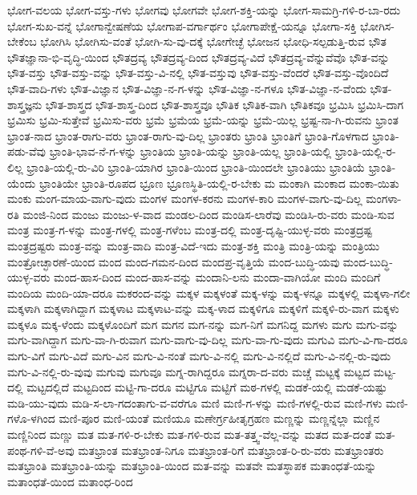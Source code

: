 {ಭೋಗ-ವಲಯ
ಭೋಗ-ವಸ್ತು-ಗಳು
ಭೋಗವು
ಭೋಗವೇ
ಭೋಗ-ಶಕ್ತಿ-ಯನ್ನು
ಭೋಗ-ಸಾಮಗ್ರಿ-ಗಳಿ-ರ-ಬಾ-ರದು
ಭೋಗ-ಸುಖ-ವನ್ನೆ
ಭೋಗಾನ್ವೇಷಣೆಯ
ಭೋಗಾಪ-ವರ್ಗಾರ್ಥಂ
ಭೋಗಾಪೇಕ್ಷೆ-ಯನ್ನೂ
ಭೋಗಾ-ಸಕ್ತಿ
ಭೋಗಿಸ-ಬೇಕೆಂಬ
ಭೋಗಿಸಿ
ಭೋಗಿಸು-ವಂತೆ
ಭೋಗಿ-ಸು-ವು-ದಕ್ಕೆ
ಭೋಗೇಚ್ಛೆ
ಭೋಜನ
ಭೋಧಿ-ಸಲ್ಪಡುತ್ತಿ-ರುವ
ಭೌತ
ಭೌತಜ್ಞಾನಾ-ಭಿ-ವೃದ್ಧಿ-ಯಿಂದ
ಭೌತದ್ರವ್ಯ
ಭೌತದ್ರವ್ಯ-ದಿಂದ
ಭೌತದ್ರವ್ಯ-ವಿದೆ
ಭೌತದ್ರವ್ಯ-ವೆನ್ನುವೆವೊ
ಭೌತ-ವನ್ನು
ಭೌತ-ವಸ್ತು
ಭೌತ-ವಸ್ತು-ವನ್ನು
ಭೌತ-ವಸ್ತು-ವಿ-ನಲ್ಲಿ
ಭೌತ-ವಸ್ತುವು
ಭೌತ-ವಸ್ತು-ವೆಂದರೆ
ಭೌತ-ವಸ್ತು-ವೊಂದಿದೆ
ಭೌತ-ವಾದಿ-ಗಳು
ಭೌತ-ವಿಜ್ಞಾನ
ಭೌತ-ವಿಜ್ಞಾ-ನ-ಗ-ಳನ್ನು
ಭೌತ-ವಿಜ್ಞಾ-ನ-ಗಳೂ
ಭೌತ-ವಿಜ್ಞಾ-ನ-ವೆಂದು
ಭೌತ-ಶಾಸ್ತ್ರಜ್ಞನು
ಭೌತ-ಶಾಸ್ತ್ರದ
ಭೌತ-ಶಾಸ್ತ್ರ-ದಿಂದ
ಭೌತ-ಶಾಸ್ತ್ರವೂ
ಭೌತಿಕ
ಭೌತಿಕ-ವಾಗಿ
ಭೌತಿಕವೂ
ಭ್ರಮಿಸಿ
ಭ್ರಮಿಸಿ-ದಾಗ
ಭ್ರಮಿಸು
ಭ್ರಮಿ-ಸುತ್ತೇವೆ
ಭ್ರಮಿಸು-ವರು
ಭ್ರಮೆ
ಭ್ರಮೆಯ
ಭ್ರಮೆ-ಯನ್ನು
ಭ್ರಮೆ-ಯಿಲ್ಲ
ಭ್ರಷ್ಟ-ನಾ-ಗಿ-ರುವನು
ಭ್ರಾಂತ
ಭ್ರಾಂತ-ನಾದ
ಭ್ರಾಂತ-ರಾಗು-ವರು
ಭ್ರಾಂತ-ರಾಗು-ವು-ದಿಲ್ಲ
ಭ್ರಾಂತರು
ಭ್ರಾಂತಿ
ಭ್ರಾಂತಿಗೆ
ಭ್ರಾಂತಿ-ಗೊಳಗಾದ
ಭ್ರಾಂತಿ-ಪಡು-ವೆವು
ಭ್ರಾಂತಿ-ಭಾವ-ನೆ-ಗ-ಳನ್ನು
ಭ್ರಾಂತಿಯ
ಭ್ರಾಂತಿ-ಯನ್ನು
ಭ್ರಾಂತಿ-ಯಲ್ಲ
ಭ್ರಾಂತಿ-ಯಲ್ಲಿ
ಭ್ರಾಂತಿ-ಯಲ್ಲಿ-ರ-ಲಿಲ್ಲ
ಭ್ರಾಂತಿ-ಯಲ್ಲಿ-ರು-ವಿರಿ
ಭ್ರಾಂತಿ-ಯಾಗಿರ
ಭ್ರಾಂತಿ-ಯಿಂದ
ಭ್ರಾಂತಿ-ಯಿಂದಲೇ
ಭ್ರಾಂತಿಯು
ಭ್ರಾಂತಿಯೆ
ಭ್ರಾಂತಿ-ಯೆಂದು
ಭ್ರಾಂತಿಯೇ
ಭ್ರಾಂತಿ-ರೂಪದ
ಭ್ರೂಣ
ಭ್ರೂಣಸ್ಥಿತಿ-ಯಲ್ಲಿ-ರ-ಬೇಕು
ಮ
ಮಂಕಾಗಿ
ಮಂಕಾದ
ಮಂಕಾ-ಯಿತು
ಮಂಕು
ಮಂಗ-ಮಾಯ-ವಾಗು-ವುದು
ಮಂಗಳ
ಮಂಗಳ-ಕರನು
ಮಂಗಳ-ಕಾರಿ
ಮಂಗಳ-ವಾಗು-ವು-ದಿಲ್ಲ
ಮಂಗಳಾ-ರತಿ
ಮಂಜಿ-ನಿಂದ
ಮಂಜು
ಮಂಜು-ಳ-ವಾದ
ಮಂಡಲ-ದಿಂದ
ಮಂಡಿಸ-ಲಾರೆವು
ಮಂಡಿಸಿ-ರು-ವರು
ಮಂಡಿ-ಸುವ
ಮಂತ್ರ
ಮಂತ್ರ-ಗ-ಳನ್ನು
ಮಂತ್ರ-ಗಳಲ್ಲಿ
ಮಂತ್ರ-ಗಳೆಂಬ
ಮಂತ್ರ-ದಲ್ಲಿ
ಮಂತ್ರ-ದೃಷ್ಟಿ-ಯುಳ್ಳ-ವರು
ಮಂತ್ರದ್ರಷ್ಟ
ಮಂತ್ರದ್ರಷ್ಟರು
ಮಂತ್ರ-ವನ್ನು
ಮಂತ್ರ-ವಾದಿ
ಮಂತ್ರ-ವಿದೆ-ಇದು
ಮಂತ್ರ-ಶಕ್ತಿ
ಮಂತ್ರಿ
ಮಂತ್ರಿ-ಯನ್ನು
ಮಂತ್ರಿಯು
ಮಂತ್ರೋಚ್ಛಾರಣೆ-ಯಿಂದ
ಮಂದ
ಮಂದ-ಗಮನ-ದಿಂದ
ಮಂದಪ್ರ-ವೃತ್ತಿಯೆ
ಮಂದ-ಬುದ್ಧಿ-ಯವು
ಮಂದ-ಬುದ್ಧಿ-ಯುಳ್ಳ-ವರು
ಮಂದ-ಹಾಸ-ದಿಂದ
ಮಂದ-ಹಾಸ-ವನ್ನು
ಮಂದಾನಿ-ಲನು
ಮಂದಾ-ವಾಗಿಯೋ
ಮಂದಿ
ಮಂದಿಗೆ
ಮಂದಿಯ
ಮಂದಿ-ಯಾ-ದರೂ
ಮಕರಂದ-ವನ್ನು
ಮಕ್ಕಳ
ಮಕ್ಕಳಂತೆ
ಮಕ್ಕ-ಳನ್ನು
ಮಕ್ಕ-ಳನ್ನೂ
ಮಕ್ಕಳಲ್ಲಿ
ಮಕ್ಕಳಾ-ಗಲೀ
ಮಕ್ಕಳಾಗಿ
ಮಕ್ಕಳಾಗಿದ್ದಾಗ
ಮಕ್ಕಳಾಟ
ಮಕ್ಕಳಾಟ-ವನ್ನು
ಮಕ್ಕ-ಳಾದ
ಮಕ್ಕಳಿಗೂ
ಮಕ್ಕಳಿಗೆ
ಮಕ್ಕಳಿ-ರು-ವಾಗ
ಮಕ್ಕಳು
ಮಕ್ಕಳೂ
ಮಕ್ಕ-ಳೆಂದು
ಮಕ್ಕಳೊಂದಿಗೆ
ಮಗ
ಮಗನ
ಮಗ-ನನ್ನು
ಮಗ-ನಿಗೆ
ಮಗನಿದ್ದ
ಮಗಳು
ಮಗು
ಮಗು-ವನ್ನು
ಮಗು-ವಾಗಿದ್ದಾಗ
ಮಗು-ವಾ-ಗಿ-ರುವಾಗ
ಮಗು-ವಾಗು-ವು-ದಿಲ್ಲ
ಮಗು-ವಾ-ಗು-ವುದು
ಮಗುವಿ
ಮಗು-ವಿ-ಗಾ-ದರೂ
ಮಗು-ವಿಗೆ
ಮಗು-ವಿದೆ
ಮಗು-ವಿನ
ಮಗು-ವಿ-ನಂತೆ
ಮಗು-ವಿ-ನಲ್ಲಿ
ಮಗು-ವಿ-ನಲ್ಲಿದೆ
ಮಗು-ವಿ-ನಲ್ಲಿ-ರು-ವುದು
ಮಗು-ವಿ-ನಲ್ಲಿ-ರು-ವುವು
ಮಗುವು
ಮಗುವೂ
ಮಗ್ನ-ರಾಗಿದ್ದರೂ
ಮಗ್ನರಾ-ದ-ವರು
ಮಚ್ಚೆ
ಮಟ್ಟಕ್ಕೆ
ಮಟ್ಟದ
ಮಟ್ಟ-ದಲ್ಲಿ
ಮಟ್ಟದಲ್ಲಿದೆ
ಮಟ್ಟದಿಂದ
ಮಟ್ಟಿ-ಗಾ-ದರೂ
ಮಟ್ಟಿಗೂ
ಮಟ್ಟಿಗೆ
ಮಠ-ಗಳಲ್ಲಿ
ಮಡಕೆ-ಯಲ್ಲಿ
ಮಡಕೆ-ಯಷ್ಟು
ಮಡಿ-ಯು-ವುದು
ಮಡಿ-ಸ-ಲಾ-ಗದಂತಾಗು-ವ-ವರೆಗೂ
ಮಣಿ
ಮಣಿ-ಗ-ಳನ್ನು
ಮಣಿ-ಗಳಲ್ಲಿ-ರುವ
ಮಣಿ-ಗಳು
ಮಣಿ-ಗಳೊ-ಳಗಿಂದ
ಮಣಿ-ಪೂರ
ಮಣಿ-ಯಂತೆ
ಮಣಿಯೂ
ಮಣೇರ್ಗ್ರಹೀತೃಗ್ರಹಣ
ಮಣ್ಣನ್ನು
ಮಣ್ಣನ್ನೆಲ್ಲಾ
ಮಣ್ಣಿನ
ಮಣ್ಣಿನಿಂದ
ಮಣ್ಣು
ಮತ
ಮತ-ಗಳಿ-ರ-ಬೇಕು
ಮತ-ಗಳಿ-ರುವ
ಮತ-ತತ್ತ್ವ-ವೆಲ್ಲ-ವನ್ನು
ಮತದ
ಮತ-ದಂತೆ
ಮತ-ಪಂಥ-ಗಳಿ-ವೆ-ಅವು
ಮತಭ್ರಾಂತ
ಮತಭ್ರಾಂತ-ನಿಗೂ
ಮತಭ್ರಾಂತ-ರಿಗೆ
ಮತಭ್ರಾಂತ-ರಿ-ರು-ವರು
ಮತಭ್ರಾಂತರು
ಮತಭ್ರಾಂತಿ
ಮತಭ್ರಾಂತಿ-ಯನ್ನು
ಮತಭ್ರಾಂತಿ-ಯಿಂದ
ಮತ-ವನ್ನು
ಮತವೇ
ಮತಸ್ಥಾಪಕ
ಮತಾಂಧತೆ-ಯನ್ನು
ಮತಾಂಧತೆ-ಯಿಂದ
ಮತಾಂಧ-ರಿಂದ
}
